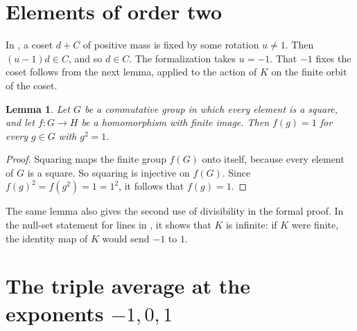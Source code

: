 \documentclass[11pt,a4paper]{amsart}
\newtheorem{lemma}[theorem]{Lemma}
\theoremstyle{remark}
\begin{document}
\section{Elements of order two}\label{sec:involution}

In \cite[Lemma~2.4]{OpenAI}, a coset $d+C$ of positive mass is fixed by some rotation $u\ne1$. Then $(u-1)d\in C$,
and so $d\in C$. The formalization takes $u=-1$. That $-1$ fixes the coset follows from the next lemma, applied to
the action of $K$ on the finite orbit of the coset.

\begin{lemma}\label{lem:involution}
Let $G$ be a commutative group in which every element is a square, and let $f\colon G\to H$ be a homomorphism with
finite image. Then $f(g)=1$ for every $g\in G$ with $g^2=1$.
\end{lemma}

\begin{proof}
Squaring maps the finite group $f(G)$ onto itself, because every element of $G$ is a square. So squaring is
injective on $f(G)$. Since $f(g)^2=f(g^2)=1=1^2$, it follows that $f(g)=1$.
\end{proof}

The same lemma also gives the second use of divisibility in the formal proof. In the null-set statement for lines in
\cite[Lemma~2.4]{OpenAI}, it shows that $K$ is infinite: if $K$ were finite, the identity map of $K$ would send $-1$
to $1$.

\section{The triple average at the exponents \texorpdfstring{$-1,0,1$}{-1, 0, 1}}\label{sec:triple}
\end{document}
